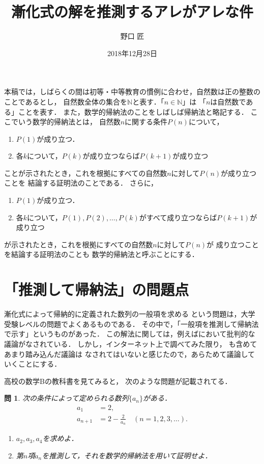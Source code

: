 \documentclass[11pt,a4paper]{ltjsarticle} %
\title{漸化式の解を推測するアレがアレな件}
\author{野口 匠}
\date{2018年12月28日}
\theoremstyle{mystyle} %
\newtheorem{que}{問} %
\begin{document}
%
\maketitle

本稿では，しばらくの間は初等・中等教育の慣例に合わせ，自然数は正の整数のことであるとし，
自然数全体の集合を$\mathbb{N}$と表す．「$n \in \mathbb{N}$」は
「$n$は自然数である」ことを表す．
また，数学的帰納法のことをしばしば帰納法と略記する．
ここでいう数学的帰納法とは，
自然数$n$に関する条件$P(n)$について，
\begin{enumerate}
	\item $P(1)$が成り立つ．
	\item 各$k$について，$P(k)$が成り立つならば$P(k+1)$が成り立つ
\end{enumerate}
ことが示されたとき，これを根拠にすべての自然数$n$に対して$P(n)$が成り立つことを
結論する証明法のことである．
さらに，
\begin{enumerate}
	\item $P(1)$が成り立つ．
	\item 各$k$について，$P(1),P(2),\ldots, P(k)$がすべて成り立つならば$P(k+1)$が成り立つ
\end{enumerate}
が示されたとき，これを根拠にすべての自然数$n$に対して$P(n)$が
成り立つことを結論する証明法のことも
数学的帰納法と呼ぶことにする．

%

\section{「推測して帰納法」の問題点}


漸化式によって帰納的に定義された数列の一般項を求める
という問題は，大学受験レベルの問題でよくあるものである．
その中で，「一般項を推測して帰納法で示す」というものがあった．
この解法に関しては，例えば\cite{izumi}において批判的な議論がなされている．
しかし，インターネット上で調べてみた限り，
\cite{izumi}も含めてあまり踏み込んだ議論は
なされてはいないと感じたので，あらためて議論していくことにする．


高校の数学Bの教科書\cite{kyoukasyo}を見てみると，
次のような問題が記載されてる．

\begin{que} \label{que:suisoku}
	次の条件によって定められる数列$\{ a_n \}$がある．
	\begin{align*}
		a_1     & = 2 ,                                          \\
		a_{n+1} & = 2- \frac{2}{a_n} \quad ( n = 1,2,3, \ldots).
	\end{align*}
	\begin{enumerate}
		\item $a_2,a_3,a_4$を求めよ．
		\item 第$n$項$a_n$を推測して，それを数学的帰納法を用いて証明せよ．
	\end{enumerate}
\end{que}
\end{document}
